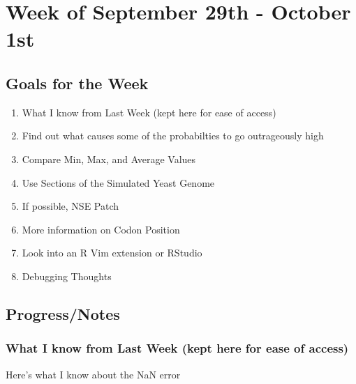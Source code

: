 \section{Week of September 29th - October 1st}
\subsection{Goals for the Week}
\begin{enumerate}
\item What I know from Last Week (kept here for ease of access)
\item Find out what causes some of the probabilties to go outrageously high
\item Compare Min, Max, and Average Values
\item Use Sections of the Simulated Yeast Genome
\item If possible, NSE Patch
\item More information on Codon Position
\item Look into an R Vim extension or RStudio
\item Debugging Thoughts
\end{enumerate}

\subsection{Progress/Notes}

\subsubsection{What I know from Last Week (kept here for ease of access)}

Here's what I know about the NaN error

